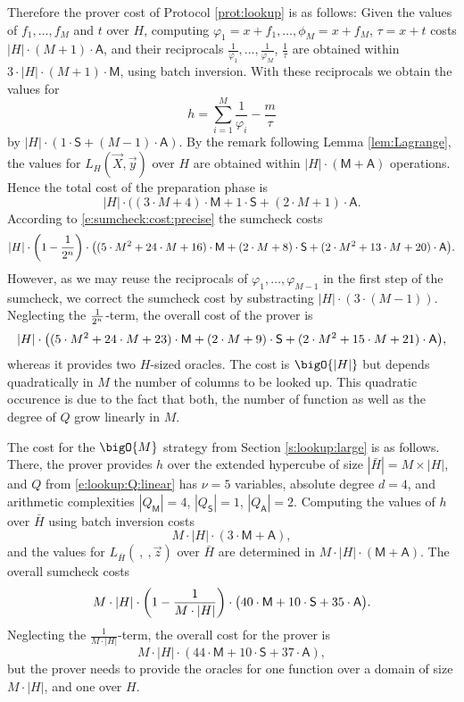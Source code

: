 \documentclass[11pt]{article}
\theoremstyle{definition}
\theoremstyle{remark}
\begin{document}
Therefore the prover cost of Protocol \ref{prot:lookup} is as follows:
Given the values of $f_1, \ldots, f_M$ and $t$ over $H$, computing $\varphi_1 = x + f_1, \ldots, \phi_M = x + f_M$,  $\tau = x + t$ costs $|H|\cdot (M+ 1) \cdot\mathsf A$, and their reciprocals $\frac{1}{\varphi_1},  \ldots, \frac{1}{\varphi_M}$, $\frac{1}{\tau}$ are obtained within $3\cdot |H| \cdot (M+1) \cdot\mathsf M$, using batch inversion. 
With these reciprocals we obtain the values for
\[
h = \sum_{i=1}^M \frac{1}{\varphi_i} - \frac{m}{\tau} 
\]
by $|H|\cdot (1\cdot \mathsf S +(M-1)\cdot\mathsf A)$. 
By the remark following Lemma \ref{lem:Lagrange}, the values for $L_H(\vec X, \vec y)$ over $H$ are obtained within $|H|\cdot (\mathsf M + \mathsf A)$ operations. 
Hence the total cost of the preparation phase is
\[
|H|\cdot ((3\cdot M + 4)\cdot\mathsf M + 1\cdot\mathsf S + (2\cdot M + 1) \cdot\mathsf A.
\]
According to \eqref{e:sumcheck:cost:precise} the sumcheck costs  
\begin{equation*}
|H| \cdot \left(1-\frac{1}{2^{n}}\right)\cdot \big((5\cdot M^2 + 24 \cdot M + 16) \cdot\textsf M + (2\cdot M + 8)\cdot\textsf S + (2\cdot M^2 + 13\cdot M + 20) \cdot \textsf A\big).
\end{equation*}
However, as we may reuse the reciprocals of $\varphi_1,  \ldots, \varphi_{M-1}$ in the first step of the sumcheck, we correct the sumcheck cost by substracting $|H|\cdot (3\cdot (M-1))$. 
Neglecting the $\nicefrac{1}{2^{n}}$-term, the overall cost of the prover is 
\begin{equation}
\label{e:lookup:cost}
|H| \cdot  \big((5\cdot M^2 + 24 \cdot M + 23) \cdot\textsf M 
+ (2\cdot M + 9)\cdot\textsf S 
+ (2\cdot M^2 + 15\cdot M + 21) \cdot \textsf A\big),
\end{equation}
whereas it provides two $H$-sized oracles. 
The cost is $\bigO{|H|}$ but depends quadratically in $M$ the number of columns to be looked up. 
This quadratic occurence is due to the fact that both, the number of function as well as the degree of $Q$ grow linearly in $M$. 

The cost for the $\bigO{M}$ strategy from Section \ref{s:lookup:large} is as follows.
There, the prover provides $h$ over the extended hypercube of size $|\bar H|=M\times |H|$, and $Q$ from \eqref{e:lookup:Q:linear} has $\nu = 5$ variables, absolute degree $d=4$, and arithmetic complexities  $|Q_\mathsf M|= 4$, $|Q_\mathsf S|= 1$, $|Q_\mathsf A|=2$.
Computing the values of $h$ over $\bar H$ using batch inversion costs 
\[
M\cdot |H| \cdot(3 \cdot \mathsf M + \mathsf A),
\]
and the values for $L_{\bar H}(\:,\:, \vec z)$ over $\bar H$ are determined in $M\cdot |H|\cdot (\mathsf M + \mathsf A)$.
The overall sumcheck costs
\[
M\cdot |H| \cdot \left(1-\frac{1}{M\cdot |H|}\right)\cdot \big(40 \cdot \textsf M + 10\cdot\textsf S + 35 \cdot \textsf A\big).
\]
Neglecting the $\frac{1}{M\cdot |H|}$-term, the overall cost for the prover is
\begin{equation}
\label{e:lookup:large:cost}
M\cdot |H|\cdot (44\cdot\mathsf M + 10\cdot\mathsf S + 37\cdot\mathsf A),
\end{equation}
but the prover needs to provide the oracles for one function over  a domain of size $M\cdot|H|$, and one over $H$. 
\end{document}
